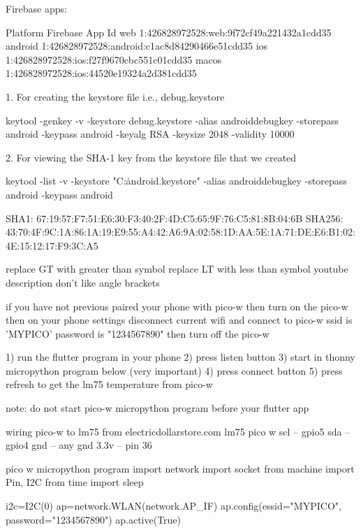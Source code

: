 Firebase apps:

Platform  Firebase App Id
web       1:426828972528:web:9f72cf49a221432a1cdd35
android   1:426828972528:android:c1ac8d84290466e51cdd35
ios       1:426828972528:ios:f27f9670cbc551c01cdd35
macos     1:426828972528:ios:44520e19324a2d381cdd35


1. For creating the keystore file i.e., debug.keystore 

keytool -genkey -v -keystore debug.keystore -alias androiddebugkey -storepass android -keypass android -keyalg RSA -keysize 2048 -validity 10000

2. For viewing the SHA-1 key from the keystore file that we created 

keytool -list -v -keystore "C:\Users{}\.android\debug.keystore" -alias androiddebugkey -storepass android -keypass android


SHA1: 67:19:57:F7:51:E6:30:F3:40:2F:4D:C5:65:9F:76:C5:81:8B:04:6B
SHA256: 43:70:4F:9C:1A:86:1A:19:E9:55:A4:42:A6:9A:02:58:1D:AA:5E:1A:71:DE:E6:B1:02:4E:15:12:17:F9:3C:A5













replace GT with greater than symbol
replace LT with less than symbol
youtube description don't like angle brackets

if you have not previous paired your phone with pico-w
then turn on the pico-w then on your phone settings
disconnect current wifi and connect to pico-w
ssid is 'MYPICO' password is "1234567890"
then turn off the pico-w

1) run the flutter program in your phone
2) press listen button
3) start in thonny micropython program below (very important)
4) press connect button
5) press refresh to get the lm75 temperature from pico-w

note: do not start pico-w micropython program before your flutter app

wiring pico-w to lm75 from electricdollarstore.com
lm75    pico w
scl  --  gpio5
sda  --  gpio4
gnd  --  any gnd
3.3v --  pin 36

pico w micropython program
import network
import socket
from machine import Pin, I2C
from time import sleep

i2c=I2C(0)
ap=network.WLAN(network.AP_IF)
ap.config(essid="MYPICO", password="1234567890")
ap.active(True)

